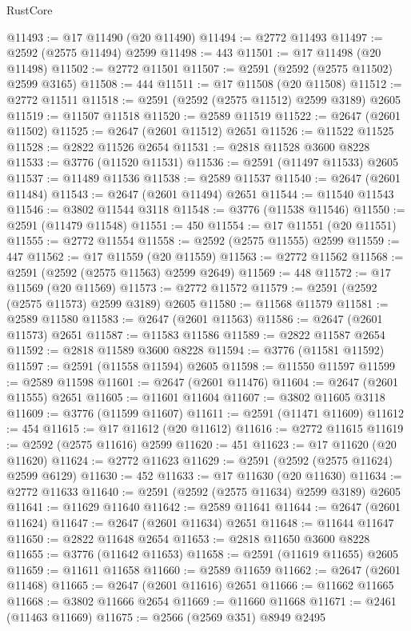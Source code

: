 \begin{lexlean}{RustCore}
\begin{coremodule}
@11493 := @17 @11490 (@20 @11490)
@11494 := @2772 @11493
@11497 := @2592 (@2575 @11494) @2599
@11498 := 443
@11501 := @17 @11498 (@20 @11498)
@11502 := @2772 @11501
@11507 := @2591 (@2592 (@2575 @11502) @2599 @3165)
@11508 := 444
@11511 := @17 @11508 (@20 @11508)
@11512 := @2772 @11511
@11518 := @2591 (@2592 (@2575 @11512) @2599 @3189) @2605
@11519 := @11507 @11518
@11520 := @2589 @11519
@11522 := @2647 (@2601 @11502)
@11525 := @2647 (@2601 @11512) @2651
@11526 := @11522 @11525
@11528 := @2822 @11526 @2654
@11531 := @2818 @11528 @3600 @8228
@11533 := @3776 (@11520 @11531)
@11536 := @2591 (@11497 @11533) @2605
@11537 := @11489 @11536
@11538 := @2589 @11537
@11540 := @2647 (@2601 @11484)
@11543 := @2647 (@2601 @11494) @2651
@11544 := @11540 @11543
@11546 := @3802 @11544 @3118
@11548 := @3776 (@11538 @11546)
@11550 := @2591 (@11479 @11548)
@11551 := 450
@11554 := @17 @11551 (@20 @11551)
@11555 := @2772 @11554
@11558 := @2592 (@2575 @11555) @2599
@11559 := 447
@11562 := @17 @11559 (@20 @11559)
@11563 := @2772 @11562
@11568 := @2591 (@2592 (@2575 @11563) @2599 @2649)
@11569 := 448
@11572 := @17 @11569 (@20 @11569)
@11573 := @2772 @11572
@11579 := @2591 (@2592 (@2575 @11573) @2599 @3189) @2605
@11580 := @11568 @11579
@11581 := @2589 @11580
@11583 := @2647 (@2601 @11563)
@11586 := @2647 (@2601 @11573) @2651
@11587 := @11583 @11586
@11589 := @2822 @11587 @2654
@11592 := @2818 @11589 @3600 @8228
@11594 := @3776 (@11581 @11592)
@11597 := @2591 (@11558 @11594) @2605
@11598 := @11550 @11597
@11599 := @2589 @11598
@11601 := @2647 (@2601 @11476)
@11604 := @2647 (@2601 @11555) @2651
@11605 := @11601 @11604
@11607 := @3802 @11605 @3118
@11609 := @3776 (@11599 @11607)
@11611 := @2591 (@11471 @11609)
@11612 := 454
@11615 := @17 @11612 (@20 @11612)
@11616 := @2772 @11615
@11619 := @2592 (@2575 @11616) @2599
@11620 := 451
@11623 := @17 @11620 (@20 @11620)
@11624 := @2772 @11623
@11629 := @2591 (@2592 (@2575 @11624) @2599 @6129)
@11630 := 452
@11633 := @17 @11630 (@20 @11630)
@11634 := @2772 @11633
@11640 := @2591 (@2592 (@2575 @11634) @2599 @3189) @2605
@11641 := @11629 @11640
@11642 := @2589 @11641
@11644 := @2647 (@2601 @11624)
@11647 := @2647 (@2601 @11634) @2651
@11648 := @11644 @11647
@11650 := @2822 @11648 @2654
@11653 := @2818 @11650 @3600 @8228
@11655 := @3776 (@11642 @11653)
@11658 := @2591 (@11619 @11655) @2605
@11659 := @11611 @11658
@11660 := @2589 @11659
@11662 := @2647 (@2601 @11468)
@11665 := @2647 (@2601 @11616) @2651
@11666 := @11662 @11665
@11668 := @3802 @11666 @2654
@11669 := @11660 @11668
@11671 := @2461 (@11463 @11669)
@11675 := @2566 (@2569 @351) @8949 @2495

\end{coremodule}
\end{lexlean}
